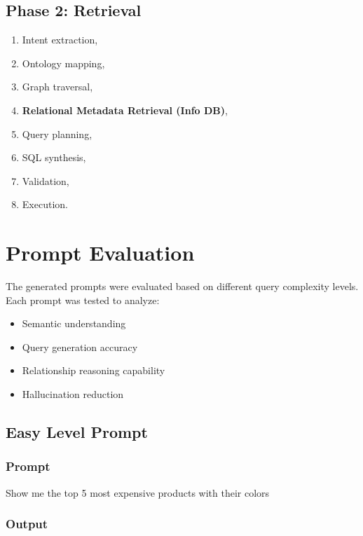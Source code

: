 \documentclass[11pt,a4paper]{article}
\begin{document}
\subsection{Phase 2: Retrieval}

\begin{enumerate}
    \item Intent extraction,
    \item Ontology mapping,
    \item Graph traversal,
    \item \textbf{Relational Metadata Retrieval (Info DB)},
    \item Query planning,
    \item SQL synthesis,
    \item Validation,
    \item Execution.
\end{enumerate}
\section{Prompt Evaluation}

The generated prompts were evaluated based on different query complexity levels. 
Each prompt was tested to analyze:
\begin{itemize}
    \item Semantic understanding
    \item Query generation accuracy
    \item Relationship reasoning capability
    \item Hallucination reduction
\end{itemize}


\subsection{Easy Level Prompt}

\subsubsection*{Prompt}

Show me the top 5 most expensive products with their colors

\vspace{0.5cm}

\subsubsection*{Output}
\end{document}
